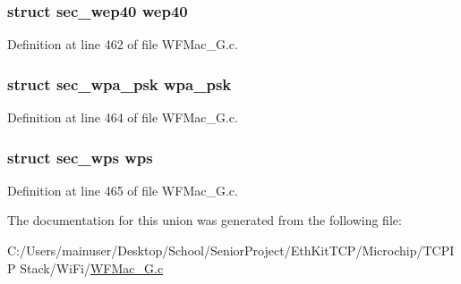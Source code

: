\hypertarget{unionsec__key_a5196592ec5195d9d371aca694d2c4d80}{}
\subsubsection[{wep40}]{\setlength{\rightskip}{0pt plus 5cm}struct {\bf sec\+\_\+wep40} wep40}\label{unionsec__key_a5196592ec5195d9d371aca694d2c4d80}


Definition at line 462 of file W\+F\+Mac\+\_\+G.\+c.

\hypertarget{unionsec__key_a2ccb9e057aaf3c0850c9587eaa8b700e}{}
\subsubsection[{wpa\+\_\+psk}]{\setlength{\rightskip}{0pt plus 5cm}struct {\bf sec\+\_\+wpa\+\_\+psk} wpa\+\_\+psk}\label{unionsec__key_a2ccb9e057aaf3c0850c9587eaa8b700e}


Definition at line 464 of file W\+F\+Mac\+\_\+G.\+c.

\hypertarget{unionsec__key_a29ddfcaba6443459a450b55b606d7e2a}{}
\subsubsection[{wps}]{\setlength{\rightskip}{0pt plus 5cm}struct {\bf sec\+\_\+wps} wps}\label{unionsec__key_a29ddfcaba6443459a450b55b606d7e2a}


Definition at line 465 of file W\+F\+Mac\+\_\+G.\+c.



The documentation for this union was generated from the following file\+:\begin{DoxyCompactItemize}
\item 
C\+:/\+Users/mainuser/\+Desktop/\+School/\+Senior\+Project/\+Eth\+Kit\+T\+C\+P/\+Microchip/\+T\+C\+P\+I\+P Stack/\+Wi\+Fi/\hyperlink{_w_f_mac__24_g_8c}{W\+F\+Mac\+\_\+G.\+c}\end{DoxyCompactItemize}
